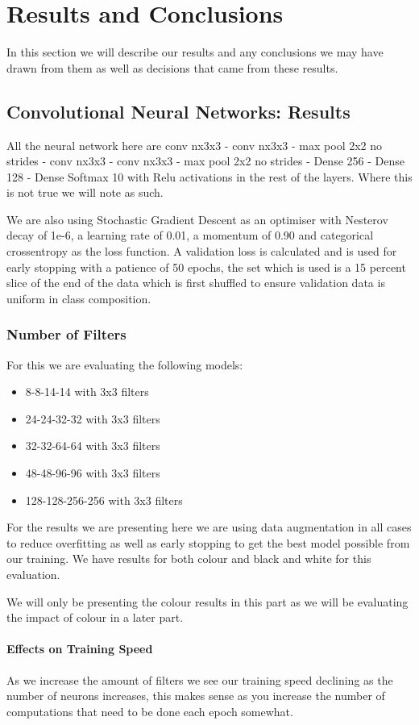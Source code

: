 \chapter{Results and Conclusions}
In this section we will describe our results and any conclusions we may have drawn from them as well as decisions that came from these results.
\section{Convolutional Neural Networks: Results}
All the neural network here are conv nx3x3 - conv nx3x3 - max pool 2x2 no strides - conv nx3x3 - conv nx3x3 - max pool 2x2 no strides - Dense 256 - Dense 128 - Dense Softmax 10 with Relu activations in the rest of the layers. Where this is not true we will note as such.

We are also using Stochastic Gradient Descent as an optimiser with Nesterov decay of 1e-6, a learning rate of 0.01, a momentum of 0.90 and categorical crossentropy as the loss function. A validation loss is calculated and is used for early stopping with a patience of 50 epochs, the set which is used is a 15 percent slice of the end of the data which is first shuffled to ensure validation data is uniform in class composition.

\subsection{Number of Filters}
For this we are evaluating the following models:
\begin{itemize}
	\item 8-8-14-14 with 3x3 filters
	\item 24-24-32-32 with 3x3 filters
	\item 32-32-64-64 with 3x3 filters
	\item 48-48-96-96 with 3x3 filters
	\item 128-128-256-256 with 3x3 filters
\end{itemize}

For the results we are presenting here we are using data augmentation in all cases to reduce overfitting as well as early stopping to get the best model possible from our training. We have results for both colour and black and white for this evaluation.

We will only be presenting the colour results in this part as we will be evaluating the impact of colour in a later part.

\subsubsection{Effects on Training Speed}
As we increase the amount of filters we see our training speed declining as the number of neurons increases, this makes sense as you increase the number of computations that need to be done each epoch somewhat.

